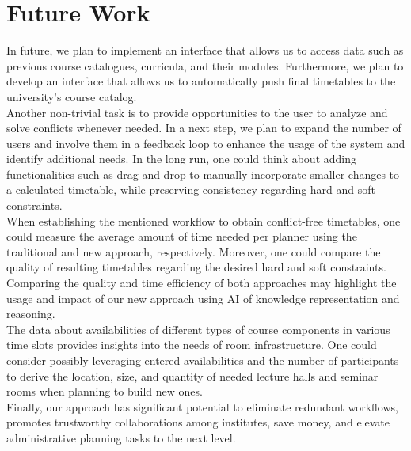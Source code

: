 \documentclass{easychair}
\begin{document}
\section{Future Work}
\label{sec:future}
  In future, we plan to implement an interface that allows us to access data such as previous course catalogues, curricula, and their modules.
  Furthermore, we plan to develop an interface that allows us to automatically push final timetables to the university's course catalog. \\
  Another non-trivial task is to provide opportunities to the user to analyze and solve conflicts whenever needed.  
  In a next step, we plan to expand the number of users and involve them in a feedback loop to enhance the usage of the system and identify additional needs.
  In the long run, one could think about adding functionalities such as drag and drop to manually incorporate smaller changes to a calculated timetable, while preserving consistency regarding hard and soft constraints. \\
  When establishing the mentioned workflow to obtain conflict-free timetables, one could measure the average amount of time needed per planner using the traditional and new approach, respectively.
  Moreover, one could compare the quality of resulting timetables regarding the desired hard and soft constraints. 
  Comparing the quality and time efficiency of both approaches may highlight the usage and impact of our new approach using AI of knowledge representation and reasoning. \\
  The data about availabilities of different types of course components in various time slots provides insights into the needs of room infrastructure. 
  One could consider possibly leveraging entered availabilities and the number of participants to derive the location, size, and quantity of needed lecture halls and seminar rooms when planning to build new ones. \\
  Finally, our approach has significant potential to eliminate redundant workflows, promotes trustworthy collaborations among institutes, save money, and elevate administrative planning tasks to the next level. 


\label{sec:bib}

%
%
%



\end{document}
